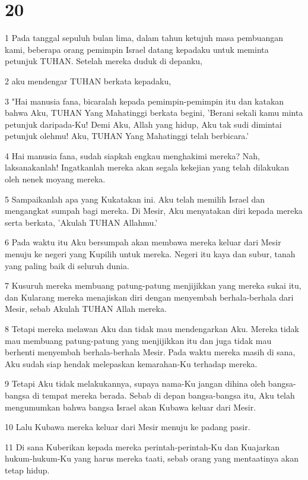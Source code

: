\chapter{20}

\par 1 Pada tanggal sepuluh bulan lima, dalam tahun ketujuh masa pembuangan kami, beberapa orang pemimpin Israel datang kepadaku untuk meminta petunjuk TUHAN. Setelah mereka duduk di depanku,
\par 2 aku mendengar TUHAN berkata kepadaku,
\par 3 "Hai manusia fana, bicaralah kepada pemimpin-pemimpin itu dan katakan bahwa Aku, TUHAN Yang Mahatinggi berkata begini, 'Berani sekali kamu minta petunjuk daripada-Ku! Demi Aku, Allah yang hidup, Aku tak sudi dimintai petunjuk olehmu! Aku, TUHAN Yang Mahatinggi telah berbicara.'
\par 4 Hai manusia fana, sudah siapkah engkau menghakimi mereka? Nah, laksanakanlah! Ingatkanlah mereka akan segala kekejian yang telah dilakukan oleh nenek moyang mereka.
\par 5 Sampaikanlah apa yang Kukatakan ini. Aku telah memilih Israel dan mengangkat sumpah bagi mereka. Di Mesir, Aku menyatakan diri kepada mereka serta berkata, 'Akulah TUHAN Allahmu.'
\par 6 Pada waktu itu Aku bersumpah akan membawa mereka keluar dari Mesir menuju ke negeri yang Kupilih untuk mereka. Negeri itu kaya dan subur, tanah yang paling baik di seluruh dunia.
\par 7 Kusuruh mereka membuang patung-patung menjijikkan yang mereka sukai itu, dan Kularang mereka menajiskan diri dengan menyembah berhala-berhala dari Mesir, sebab Akulah TUHAN Allah mereka.
\par 8 Tetapi mereka melawan Aku dan tidak mau mendengarkan Aku. Mereka tidak mau membuang patung-patung yang menjijikkan itu dan juga tidak mau berhenti menyembah berhala-berhala Mesir. Pada waktu mereka masih di sana, Aku sudah siap hendak melepaskan kemarahan-Ku terhadap mereka.
\par 9 Tetapi Aku tidak melakukannya, supaya nama-Ku jangan dihina oleh bangsa-bangsa di tempat mereka berada. Sebab di depan bangsa-bangsa itu, Aku telah mengumumkan bahwa bangsa Israel akan Kubawa keluar dari Mesir.
\par 10 Lalu Kubawa mereka keluar dari Mesir menuju ke padang pasir.
\par 11 Di sana Kuberikan kepada mereka perintah-perintah-Ku dan Kuajarkan hukum-hukum-Ku yang harus mereka taati, sebab orang yang mentaatinya akan tetap hidup.
